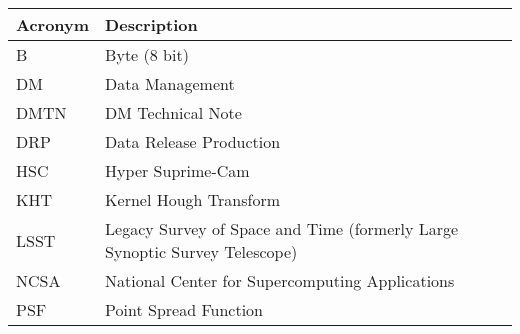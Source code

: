 \addtocounter{table}{-1}
\begin{longtable}{p{}p{}}\hline
\textbf{Acronym} & \textbf{Description}  \\\hline

B & Byte (8 bit) \\\hline
DM & Data Management \\\hline
DMTN & DM Technical Note \\\hline
DRP & Data Release Production \\\hline
HSC & Hyper Suprime-Cam \\\hline
KHT & Kernel Hough Transform \\\hline
LSST & Legacy Survey of Space and Time (formerly Large Synoptic Survey Telescope) \\\hline
NCSA & National Center for Supercomputing Applications \\\hline
PSF & Point Spread Function \\\hline
\end{longtable}
